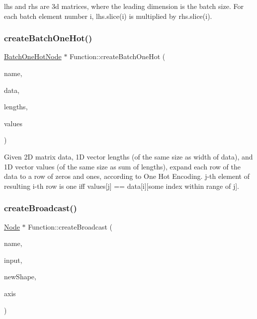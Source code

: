 {\ttfamily lhs} and {\ttfamily rhs} are 3d matrices, where the leading dimension is the batch size. For each batch element number i, lhs.\+slice(i) is multiplied by rhs.\+slice(i). \mbox{\label{classglow_1_1_function_a0863b14aadd1072ca7f12a1925a790b0}} 
\subsubsection{\texorpdfstring{create\+Batch\+One\+Hot()}{createBatchOneHot()}}
{\footnotesize\ttfamily \hyperlink{classglow_1_1_batch_one_hot_node}{Batch\+One\+Hot\+Node} $\ast$ Function\+::create\+Batch\+One\+Hot (\begin{DoxyParamCaption}\item[{llvm\+::\+String\+Ref}]{name,  }\item[{\hyperlink{structglow_1_1_node_value}{Node\+Value}}]{data,  }\item[{\hyperlink{structglow_1_1_node_value}{Node\+Value}}]{lengths,  }\item[{\hyperlink{structglow_1_1_node_value}{Node\+Value}}]{values }\end{DoxyParamCaption})}

Given 2D matrix {\ttfamily data}, 1D vector {\ttfamily lengths} (of the same size as width of {\ttfamily data}), and 1D vector {\ttfamily values} (of the same size as sum of {\ttfamily lengths}), expand each row of the {\ttfamily data} to a row of zeros and ones, according to One Hot Encoding. j-\/th element of resulting i-\/th row is one iff {\ttfamily values}\mbox{[}j\mbox{]} == {\ttfamily data}\mbox{[}i\mbox{]}\mbox{[}some index within range of j\mbox{]}. \mbox{\label{classglow_1_1_function_a757d71d8785b075edcc6f0e9b9bc12ac}} 
\subsubsection{\texorpdfstring{create\+Broadcast()}{createBroadcast()}}
{\footnotesize\ttfamily \hyperlink{classglow_1_1_node}{Node} $\ast$ Function\+::create\+Broadcast (\begin{DoxyParamCaption}\item[{llvm\+::\+String\+Ref}]{name,  }\item[{\hyperlink{structglow_1_1_node_value}{Node\+Value}}]{input,  }\item[{Unsigned\+Array\+Ref}]{new\+Shape,  }\item[{\hyperlink{namespaceglow_a0ca574644e1e42ef193a9947fb4d8911}{unsigned\+\_\+t}}]{axis }\end{DoxyParamCaption})}

